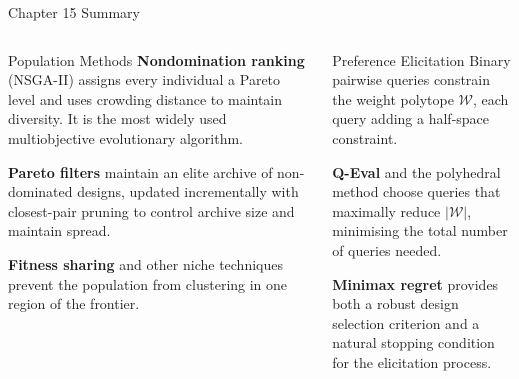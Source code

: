 \documentclass[aspectratio=169,10pt]{beamer}
\begin{document}
\begin{frame}[allowframebreaks]{Chapter 15 Summary}
\begin{columns}
\begin{block}{Population Methods}
  \textbf{Nondomination ranking} (NSGA-II) assigns every individual a
  Pareto level and uses crowding distance to maintain diversity.  It is
  the most widely used multiobjective evolutionary algorithm.

  \textbf{Pareto filters} maintain an elite archive of non-dominated
  designs, updated incrementally with closest-pair pruning to control
  archive size and maintain spread.

  \textbf{Fitness sharing} and other niche techniques prevent the population
  from clustering in one region of the frontier.
\end{block}

\begin{block}{Preference Elicitation}
  Binary pairwise queries constrain the weight polytope $\mathcal{W}$,
  each query adding a half-space constraint.

  \textbf{Q-Eval} and the polyhedral method choose queries that maximally
  reduce $|\mathcal{W}|$, minimising the total number of queries needed.

  \textbf{Minimax regret} provides both a robust design selection criterion
  and a natural stopping condition for the elicitation process.
\end{block}
\end{columns}

\end{frame}
\end{document}
